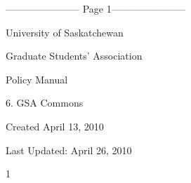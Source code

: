 ﻿----------------------- Page 1-----------------------

  

  

  

  

  

  

  

  

  

                                           University of Saskatchewan  

  

                                    Graduate Students’ Association  

  

  

  

  

  

  

  

  

  

  

  

  

  

  

  

  

  

  

  

  

  

  

  

                                                    Policy Manual  

  

                                                 6. GSA Commons  

  

  

  

  

  

  

  

Created April 13, 2010  

  

Last Updated: April 26, 2010  



                                                                      1  

